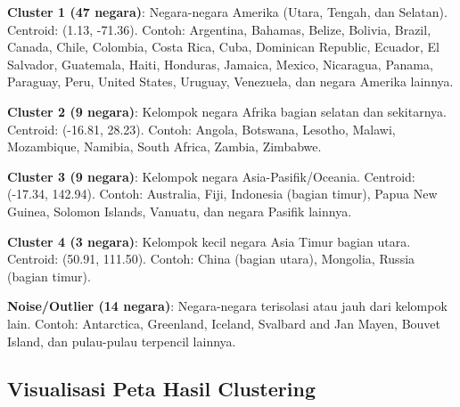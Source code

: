 \documentclass[12pt,a4paper]{article}
\begin{document}
\textbf{Cluster 1 (47 negara)}: Negara-negara Amerika (Utara, Tengah, dan Selatan). Centroid: (1.13, -71.36). Contoh: Argentina, Bahamas, Belize, Bolivia, Brazil, Canada, Chile, Colombia, Costa Rica, Cuba, Dominican Republic, Ecuador, El Salvador, Guatemala, Haiti, Honduras, Jamaica, Mexico, Nicaragua, Panama, Paraguay, Peru, United States, Uruguay, Venezuela, dan negara Amerika lainnya.

\textbf{Cluster 2 (9 negara)}: Kelompok negara Afrika bagian selatan dan sekitarnya. Centroid: (-16.81, 28.23). Contoh: Angola, Botswana, Lesotho, Malawi, Mozambique, Namibia, South Africa, Zambia, Zimbabwe.

\textbf{Cluster 3 (9 negara)}: Kelompok negara Asia-Pasifik/Oceania. Centroid: (-17.34, 142.94). Contoh: Australia, Fiji, Indonesia (bagian timur), Papua New Guinea, Solomon Islands, Vanuatu, dan negara Pasifik lainnya.

\textbf{Cluster 4 (3 negara)}: Kelompok kecil negara Asia Timur bagian utara. Centroid: (50.91, 111.50). Contoh: China (bagian utara), Mongolia, Russia (bagian timur).

\textbf{Noise/Outlier (14 negara)}: Negara-negara terisolasi atau jauh dari kelompok lain. Contoh: Antarctica, Greenland, Iceland, Svalbard and Jan Mayen, Bouvet Island, dan pulau-pulau terpencil lainnya.

\newpage
\subsection{Visualisasi Peta Hasil Clustering}
\end{document}
